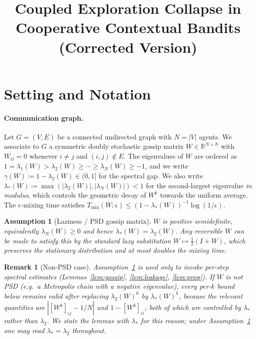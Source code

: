 \documentclass[11pt]{article}
\title{Coupled Exploration Collapse in Cooperative Contextual Bandits\\
\large (Corrected Version)}
\author{}
\date{}
\newtheorem{assumption}[theorem]{Assumption}
\newtheorem*{remark}{Remark}
\begin{document}
\maketitle
\tableofcontents
\newpage

\section{Setting and Notation}\label{sec:setting}

\paragraph{Communication graph.}
Let $G=(V,E)$ be a connected undirected graph with $N=|V|$ agents.
We associate to $G$ a symmetric doubly stochastic gossip matrix
$W\in\mathbb{R}^{N\times N}$ with $W_{ij}=0$ whenever $i\neq j$
and $(i,j)\notin E$.  The eigenvalues of $W$ are ordered as
$1=\lambda_1(W)>\lambda_2(W)\geq\cdots\geq\lambda_N(W)\geq -1$,
and we write $\gamma(W)\coloneqq 1-\lambda_2(W)\in(0,1]$ for the
spectral gap.  We also write
$\lambda_*(W)\coloneqq\max(|\lambda_2(W)|,|\lambda_N(W)|)<1$
for the second-largest eigenvalue \emph{in modulus}, which controls
the geometric decay of $W^k$ towards the uniform average.
The $\epsilon$-mixing time satisfies
$T_{\mathrm{mix}}(W;\epsilon)\leq(1-\lambda_*(W))^{-1}\log(1/\epsilon)$.

\begin{assumption}[Laziness / PSD gossip matrix]\label{ass:lazy}
$W$ is positive semidefinite, equivalently $\lambda_N(W)\geq 0$ and
hence $\lambda_*(W)=\lambda_2(W)$.  Any reversible $W$ can be made to
satisfy this by the standard lazy substitution
$W\mapsto\tfrac12(I+W)$, which preserves the stationary distribution
and at most doubles the mixing time.
\end{assumption}

\begin{remark}[Non-PSD case]\label{rem:lazy}
Assumption~\ref{ass:lazy} is used only to invoke per-step spectral
estimates (Lemmas~\ref{lem:gossip}, \ref{lem:leakage},
\ref{lem:prop}).  If $W$ is \emph{not} PSD (e.g.\ a Metropolis chain
with a negative eigenvalue), every per-$k$ bound below remains valid
after replacing $\lambda_2(W)^k$ by $\lambda_*(W)^k$, because
the relevant quantities are $|[W^k]_{ij}-1/N|$ and
$1-[W^k]_{ii}$, both of which are controlled by $\lambda_*$ rather
than $\lambda_2$.  We state the lemmas with $\lambda_*$ for this
reason; under Assumption~\ref{ass:lazy} one may read
$\lambda_*=\lambda_2$ throughout.
\end{remark}
\end{document}
